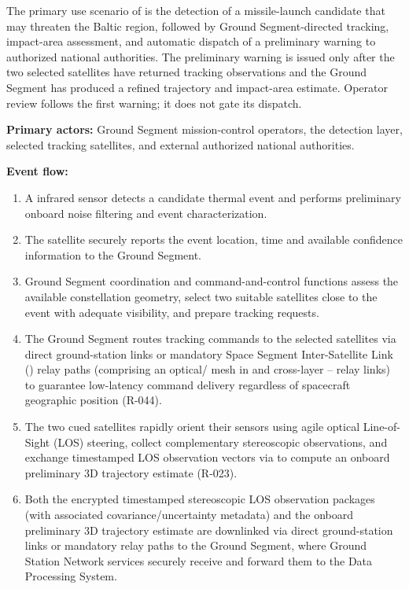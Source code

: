 The primary use scenario of  is the detection of a missile-launch candidate that may threaten the Baltic region, followed by Ground Segment-directed tracking, impact-area assessment, and automatic dispatch of a preliminary warning to authorized national authorities. The preliminary warning is issued only after the two selected  satellites have returned tracking observations and the Ground Segment has produced a refined trajectory and impact-area estimate. Operator review follows the first warning; it does not gate its dispatch.

\textbf{Primary actors:} Ground Segment mission-control operators, the  detection layer, selected  tracking satellites, and external authorized national authorities.

\textbf{Event flow:}
\begin{enumerate}
    \item A  infrared sensor detects a candidate thermal event and performs preliminary onboard noise filtering and event characterization.
    \item The  satellite securely reports the event location, time and available confidence information to the Ground Segment.
    \item Ground Segment coordination and command-and-control functions assess the available constellation geometry, select two suitable  satellites close to the event with adequate visibility, and prepare tracking requests.
    \item The Ground Segment routes tracking commands to the selected  satellites via direct ground-station links or mandatory Space Segment Inter-Satellite Link () relay paths (comprising an optical/  mesh in  and cross-layer -- relay links) to guarantee low-latency command delivery regardless of spacecraft geographic position (R-044).
    \item The two cued  satellites rapidly orient their sensors using agile optical Line-of-Sight (LOS) steering, collect complementary stereoscopic observations, and exchange timestamped LOS observation vectors via  to compute an onboard preliminary 3D trajectory estimate (R-023).
    \item Both the encrypted timestamped stereoscopic LOS observation packages (with associated covariance/uncertainty metadata) and the onboard preliminary 3D trajectory estimate are downlinked via direct ground-station links or mandatory  relay paths to the Ground Segment, where Ground Station Network services securely receive and forward them to the Data Processing System.

\end{enumerate}
